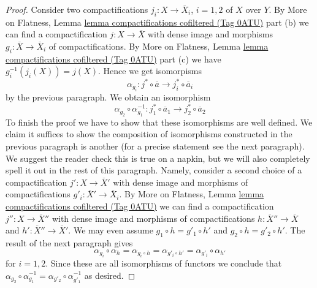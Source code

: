 \documentclass{amsart}
\theoremstyle{plain}
\theoremstyle{definition}
\theoremstyle{remark}
\numberwithin{equation}{subsection}
\begin{document}
\begin{proof}
\medskip\noindent
Consider two compactifications $j_i : X \to \overline{X}_i$, $i = 1, 2$
of $X$ over $Y$. By More on Flatness, Lemma
\href{https://stacks.math.columbia.edu/tag/0ATU}{lemma compactifications cofiltered (Tag 0ATU)} part (b)
we can find a compactification $j : X \to \overline{X}$
with dense image and morphisms
$g_i : \overline{X} \to \overline{X}_i$ of compactifications.
By More on Flatness, Lemma
\href{https://stacks.math.columbia.edu/tag/0ATU}{lemma compactifications cofiltered (Tag 0ATU)} part (c)
we have $g_i^{-1}(j_i(X)) = j(X)$. Hence we get isomorpisms
$$
\alpha_{g_i} :
j^* \circ \overline{a}
\longrightarrow
j_i^* \circ \overline{a}_i
$$
by the previous paragraph. We obtain an isomorphism
$$
\alpha_{g_2} \circ \alpha_{g_1}^{-1} :
j_1^* \circ \overline{a}_1 \to j_2^* \circ \overline{a}_2
$$
To finish the proof we have to show that these isomorphisms are well defined.
We claim it suffices to show the composition of isomorphisms constructed
in the previous paragraph is another (for a precise statement see the next
paragraph). We suggest the reader check this is true on a napkin, but we
will also completely spell it out in the rest of this paragraph.
Namely, consider a second choice of a compactification
$j' : X \to \overline{X}'$ with dense image
and morphisms of compactifications $g'_i : \overline{X}' \to \overline{X}_i$.
By More on Flatness, Lemma \href{https://stacks.math.columbia.edu/tag/0ATU}{lemma compactifications cofiltered (Tag 0ATU)}
we can find a compactification $j'' : X \to \overline{X}''$
with dense image and morphisms of compactifications
$h : \overline{X}'' \to \overline{X}$ and
$h' : \overline{X}'' \to \overline{X}'$. We may even assume
$g_1 \circ h = g'_1 \circ h'$ and $g_2 \circ h = g'_2 \circ h'$.
The result of the next paragraph gives
$$
\alpha_{g_i} \circ \alpha_h = \alpha_{g_i \circ h} =
\alpha_{g'_i \circ h'} = \alpha_{g'_i} \circ \alpha_{h'}
$$
for $i = 1, 2$. Since these are all isomorphisms of functors
we conclude that $\alpha_{g_2} \circ \alpha_{g_1}^{-1} =
\alpha_{g'_2} \circ \alpha_{g'_1}^{-1}$ as desired.


\end{proof}
\end{document}
